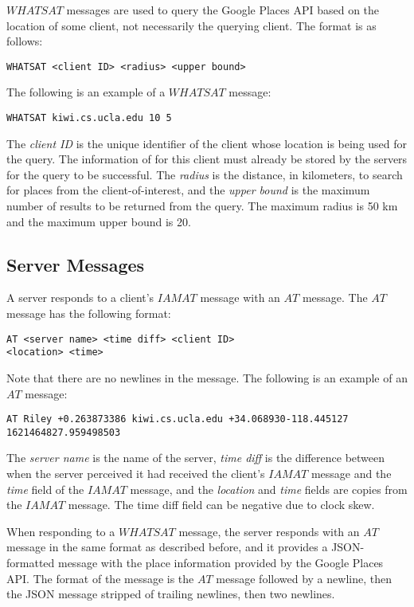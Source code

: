 $WHATSAT$ messages are used to query the Google Places API based on the location of some client, not necessarily the querying client. The format is as follows:
\begin{center}
  \texttt{WHATSAT <client ID> <radius> <upper bound>}
\end{center}
The following is an example of a $WHATSAT$ message:
\begin{center}
  \texttt{WHATSAT kiwi.cs.ucla.edu 10 5}
\end{center}
The \textit{client ID} is the unique identifier of the client whose location is being used for the query. The information of for this client must already be stored by the servers for the query to be successful. The \textit{radius} is the distance, in kilometers, to search for places from the client-of-interest, and the \textit{upper bound} is the maximum number of results to be returned from the query. The maximum radius is 50 km and the maximum upper bound is 20.

\subsection{Server Messages}
A server responds to a client's $IAMAT$ message with an $AT$ message. The $AT$ message has the following format:
\begin{center}
  \texttt{AT <server name> <time diff> <client ID> \\ <location> <time>}
\end{center}
Note that there are no newlines in the message. The following is an example of an $AT$ message:
\begin{center}
  \texttt{AT Riley +0.263873386 kiwi.cs.ucla.edu +34.068930-118.445127 1621464827.959498503}
\end{center}
The \textit{server name} is the name of the server, \textit{time diff} is the difference between when the server perceived it had received the client's $IAMAT$ message and the \textit{time} field of the $IAMAT$ message, and the \textit{location} and \textit{time} fields are copies from the $IAMAT$ message. The time diff field can be negative due to clock skew.

When responding to a $WHATSAT$ message, the server responds with an $AT$ message in the same format as described before, and it provides a JSON-formatted message with the place information provided by the Google Places API. The format of the message is the $AT$ message followed by a newline, then the JSON message stripped of trailing newlines, then two newlines.

